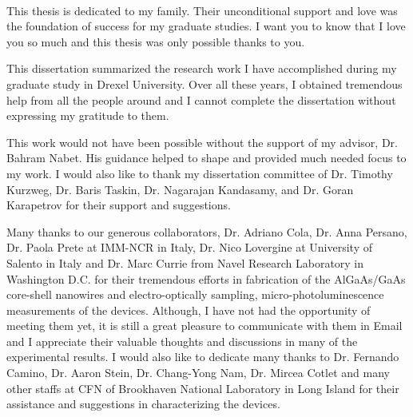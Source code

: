 \begin{preamble}

\iffinal{}{\newpage}

\begin{DUTdedications}
%
\vspace*{\fill}
%
\begin{center}
\begin{minipage}{8 cm}
\begin{center}
\hrulefill\\

This thesis is dedicated to my family. Their unconditional support and love was
the foundation of success for my graduate studies. I want you to know that I love
you so much and this thesis was only possible thanks to you.

\hrulefill
\vspace{6em}
\end{center}
\end{minipage}
\end{center}
\vspace*{\fill}
\end{DUTdedications}

\iffinal{}{\newpage}

\begin{acknowledgments}

This dissertation summarized the research work I have accomplished during my
graduate study in Drexel University. Over all these years, I obtained
tremendous help from all the people around and I cannot complete the dissertation
without expressing my gratitude to them.

This work would not have been possible without the support of my advisor, Dr.
Bahram Nabet. His guidance helped to shape and provided much needed focus to my
work. I would also like to thank my dissertation committee of Dr. Timothy
Kurzweg, Dr. Baris Taskin, Dr. Nagarajan Kandasamy, and Dr. Goran Karapetrov
for their support and suggestions.

Many thanks to our generous collaborators, Dr. Adriano Cola, Dr. Anna Persano,
Dr. Paola Prete at IMM-NCR in Italy, Dr. Nico Lovergine at University of
Salento in Italy and Dr. Marc Currie from Navel Research Laboratory in
Washington D.C. for their tremendous efforts in fabrication of the AlGaAs/GaAs
core-shell nanowires and electro-optically sampling, micro-photoluminescence
measurements of the devices. Although, I have not had the opportunity of
meeting them yet, it is still a great pleasure to communicate with them in
Email and I appreciate their valuable thoughts and discussions in many of the
experimental results. I would also like to dedicate many thanks to Dr. Fernando
Camino, Dr. Aaron Stein, Dr. Chang-Yong Nam, Dr. Mircea Cotlet and many other
staffs at CFN of Brookhaven National Laboratory in Long Island for their
assistance and suggestions in characterizing the devices.


\end{acknowledgments}
\end{preamble}
